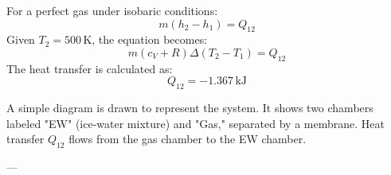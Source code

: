 For a perfect gas under isobaric conditions:  
\[
m(h_2 - h_1) = Q_{12}
\]  
Given \( T_2 = 500 \, \text{K} \), the equation becomes:  
\[
m(c_V + R) \Delta (T_2 - T_1) = Q_{12}
\]  
The heat transfer is calculated as:  
\[
Q_{12} = -1.367 \, \text{kJ}
\]  

A simple diagram is drawn to represent the system. It shows two chambers labeled "EW" (ice-water mixture) and "Gas," separated by a membrane. Heat transfer \( Q_{12} \) flows from the gas chamber to the EW chamber.

---